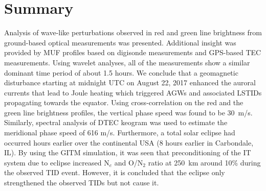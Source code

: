 \documentclass[crop=false,class=mitthesis,oneside,font=12pt]{standalone}
\begin{document}
% 
% 

\section{Summary}
Analysis of wave-like perturbations observed in red and green line brightness from ground-based optical measurements was presented. Additional insight was provided by MUF profiles based on digisonde measurements and GPS-based TEC measurements. Using wavelet analyses, all of the measurements show a similar dominant time period of about 1.5 hours. We conclude that a geomagnetic disturbance starting at midnight UTC on August 22, 2017 enhanced the auroral currents that lead to Joule heating which triggered AGWs and associated LSTIDs propagating towards the equator. Using cross-correlation on the red and the green line brightness profiles, the vertical phase speed was found to be 30~m/s. Similarly, spectral analysis of DTEC keogram was used to estimate the meridional phase speed of 616 m/s. Furthermore, a total solar eclipse had occurred hours earlier over the continental USA (8 hours earlier in Carbondale, IL). By using the GITM simulation, it was seen that preconditioning of the IT system due to eclipse increased N$_e$ and O/N$_2$ ratio at 250~km around 10\% during the observed TID event. However, it is concluded that the eclipse only strengthened the observed TIDs but not cause it.
\end{document}
